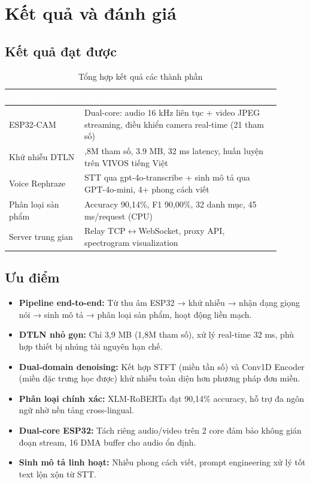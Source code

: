 \chapter{Kết quả và đánh giá}

\section{Kết quả đạt được}

\begin{table}[htbp]
\centering
\caption{Tổng hợp kết quả các thành phần}
\label{tab:results}
\begin{tabular}{>{\raggedright\arraybackslash}p{0.25\linewidth} >{\raggedright\arraybackslash}p{0.65\linewidth}}
\toprule
\rowcolor{headerblue} \textcolor{white}{\textbf{Thành phần}} & \textcolor{white}{\textbf{Kết quả}} \\
\midrule
\rowcolor{rowgray} ESP32-CAM & Dual-core: audio 16 kHz liên tục + video JPEG streaming, điều khiển camera real-time (21 tham số) \\
Khử nhiễu DTLN & 1,8M tham số, 3.9 MB, 32 ms latency, huấn luyện trên VIVOS tiếng Việt \\
\rowcolor{rowgray} Voice Rephraze & STT qua gpt-4o-transcribe + sinh mô tả qua GPT-4o-mini, 4+ phong cách viết \\
Phân loại sản phẩm & Accuracy 90,14\%, F1 90,00\%, 32 danh mục, 45 ms/request (CPU) \\
\rowcolor{rowgray} Server trung gian & Relay TCP$\leftrightarrow$WebSocket, proxy API, spectrogram visualization \\
\bottomrule
\end{tabular}
\end{table}

\section{Ưu điểm}

\begin{itemize}
\item
  \textbf{Pipeline end-to-end:} Từ thu âm ESP32 → khử nhiễu → nhận dạng giọng nói
  → sinh mô tả → phân loại sản phẩm, hoạt động liền mạch.
\item
  \textbf{DTLN nhỏ gọn:} Chỉ 3,9 MB (1,8M tham số), xử lý real-time 32 ms,
  phù hợp thiết bị nhúng tài nguyên hạn chế.
\item
  \textbf{Dual-domain denoising:} Kết hợp STFT (miền tần số) và Conv1D Encoder
  (miền đặc trưng học được) khử nhiễu toàn diện hơn phương pháp đơn miền.
\item
  \textbf{Phân loại chính xác:} XLM-RoBERTa đạt 90,14\% accuracy, hỗ trợ
  đa ngôn ngữ nhờ nền tảng cross-lingual.
\item
  \textbf{Dual-core ESP32:} Tách riêng audio/video trên 2 core đảm bảo
  không gián đoạn stream, 16 DMA buffer cho audio ổn định.
\item
  \textbf{Sinh mô tả linh hoạt:} Nhiều phong cách viết, prompt engineering
  xử lý tốt text lộn xộn từ STT.
\end{itemize}


